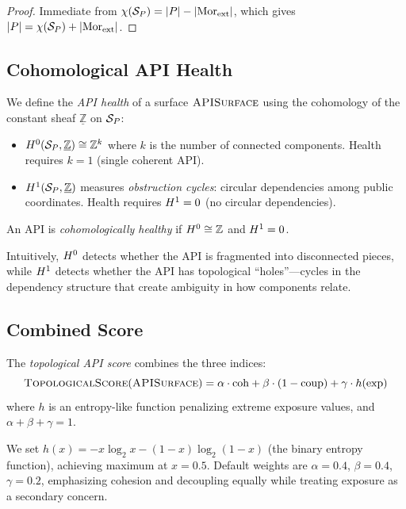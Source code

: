 \documentclass[11pt]{article}
\newcommand{\APISurface}{\textsc{APISurface}}
\newcommand{\TopoScore}{\textsc{TopologicalScore}}
\newcommand{\CohIndex}{\mathrm{coh}}
\newcommand{\CoupIndex}{\mathrm{coup}}
\newcommand{\ExpIndex}{\mathrm{exp}}
\begin{document}
\begin{proof}
Immediate from $\chi(\mathcal{S}_P) = |P| - |\mathrm{Mor}_{\mathrm{ext}}|$, which
gives $|P| = \chi(\mathcal{S}_P) + |\mathrm{Mor}_{\mathrm{ext}}|$.
\end{proof}

\subsection{Cohomological API Health}\label{sec:api-health}

\begin{definition}\label{def:api-health}
We define the \emph{API health} of a surface $\APISurface$ using the
cohomology of the constant sheaf $\underline{\mathbb{Z}}$ on $\mathcal{S}_P$:
\begin{itemize}[noitemsep]
  \item $H^{0}(\mathcal{S}_P, \underline{\mathbb{Z}}) \cong \mathbb{Z}^k$
        where $k$ is the number of connected components.  Health requires
        $k = 1$ (single coherent API).
  \item $H^{1}(\mathcal{S}_P, \underline{\mathbb{Z}})$ measures
        \emph{obstruction cycles}: circular dependencies among public
        coordinates.  Health requires $H^{1} = 0$ (no circular
        dependencies).
\end{itemize}
An API is \emph{cohomologically healthy} if $H^{0} \cong \mathbb{Z}$
and $H^{1} = 0$.
\end{definition}

Intuitively, $H^{0}$ detects whether the API is fragmented into
disconnected pieces, while $H^{1}$ detects whether the API has
topological ``holes''---cycles in the dependency structure that create
ambiguity in how components relate.

\subsection{Combined Score}

\begin{definition}\label{def:topo-score}
The \emph{topological API score} combines the three indices:
\[
  \TopoScore(\APISurface) = \alpha \cdot \CohIndex
  + \beta \cdot (1 - \CoupIndex)
  + \gamma \cdot h(\ExpIndex)
\]
where $h$ is an entropy-like function penalizing extreme exposure values,
and $\alpha + \beta + \gamma = 1$.
\end{definition}

We set $h(x) = -x \log_2 x - (1-x) \log_2(1-x)$ (the binary entropy
function), achieving maximum at $x = 0.5$.  Default weights are
$\alpha = 0.4$, $\beta = 0.4$, $\gamma = 0.2$, emphasizing cohesion and
decoupling equally while treating exposure as a secondary concern.
\end{document}
